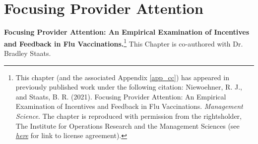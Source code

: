 \chapter{Focusing Provider Attention}

\textbf{Focusing Provider Attention: An Empirical Examination of Incentives and Feedback in Flu Vaccinations.}\footnote{This chapter (and the associated Appendix \ref{app_cc}) has appeared in previously published work under the following citation: Niewoehner, R. J., and Staats, B. R. (2021). Focusing Provider Attention: An Empirical Examination of Incentives and Feedback in Flu Vaccinations. \textit{Management Science}. The chapter is reproduced with permission from the rightsholder, The Institute for Operations Research and the Management Sciences (see \textit{\href{https://marketplace.copyright.com/rs-ui-web/mp/license/4d1e513c-a5c2-48d3-b82a-56891a9baac7/9317d961-3fc3-423f-9eff-01148c7093b6}{here}} for link to license agreement).}
This Chapter is co-authored with Dr. Bradley Staats.


